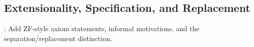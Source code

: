 \subsection{Extensionality, Specification, and Replacement}

: Add ZF-style axiom statements, informal motivations, and the separation/replacement distinction.
